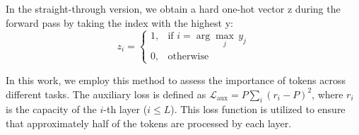 In the straight-through version, we obtain a hard one-hot vector z during the forward pass by taking the index with the highest y:
\begin{equation}
z_i = \begin{cases}
1, & \text{if } i = \arg\max\limits_j \, y_j \\
0, & \text{otherwise}
\end{cases}
\end{equation}

In this work, we employ this method to assess the importance of tokens across different tasks. The auxiliary loss is defined as \( \mathcal{L}_{\text{aux}} = P \sum_{i}(r_i - P)^2 \), where \( r_i \) is the capacity of the \( i \)-th layer (\( i \leq L \)). This loss function is utilized to ensure that approximately half of the tokens are processed by each layer.